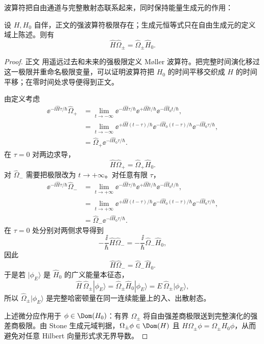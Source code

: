 波算符把自由通道与完整散射态联系起来，同时保持能量生成元的作用：


\begin{proposition}[波算符的时间演化交织]
设 $H,H_0$ 自伴，正文的强波算符极限存在；生成元恒等式只在自由生成元的定义域上陈述。则有
\begin{equation}
 {\hat H\hat\Omega_\pm=\hat\Omega_\pm\hat H_0.}
\label{eq:moller-intertwining-r68}
\end{equation}
\end{proposition}
\begin{proof}
正文 用遥远过去和未来的强极限定义 Møller 波算符。把完整时间演化移过这一极限并重命名极限变量，可以证明波算符把 $H_0$ 的时间平移交织成 $H$ 的时间平移；在零时间处求导便得到正文。



由定义考虑
\begin{align*}
 \ee^{-\ii\hat H\tau/\hbar}\hat\Omega_+
 &=
 \lim_{t\to-\infty}
 \ee^{-\ii\hat H\tau/\hbar}
 \ee^{+\ii\hat Ht/\hbar}
 \ee^{-\ii\hat H_0t/\hbar},\\
 &=
 \lim_{t\to-\infty}
 \ee^{+\ii\hat H(t-\tau)/\hbar}
 \ee^{-\ii\hat H_0(t-\tau)/\hbar}
 \ee^{-\ii\hat H_0\tau/\hbar},\\
 &=\hat\Omega_+\ee^{-\ii\hat H_0\tau/\hbar}.
\end{align*}
在 $\tau=0$ 对两边求导，
\begin{equation*}
 {
 \hat H\hat\Omega_+
 =\hat\Omega_+\hat H_0.}
 \end{equation*}
对 $\hat\Omega_-$ 需要把极限改为 $t\to+\infty$。对任意有限 $\tau$，
\begin{align*}
 \ee^{-\ii\hat H\tau/\hbar}\hat\Omega_-
 &=\lim_{t\to+\infty}
 \ee^{-\ii\hat H\tau/\hbar}
 \ee^{+\ii\hat Ht/\hbar}
 \ee^{-\ii\hat H_0t/\hbar},\\
 &=\lim_{t\to+\infty}
 \ee^{+\ii\hat H(t-\tau)/\hbar}
 \ee^{-\ii\hat H_0(t-\tau)/\hbar}
 \ee^{-\ii\hat H_0\tau/\hbar},\\
 &=\hat\Omega_-\ee^{-\ii\hat H_0\tau/\hbar}.
\end{align*}
在 $\tau=0$ 处分别对两侧求导得到
\[
 -\frac{\ii}{\hbar}\hat H\hat\Omega_-
 =-\frac{\ii}{\hbar}\hat\Omega_-\hat H_0,
\]
因此
\[
 \hat H\hat\Omega_-=\hat\Omega_-\hat H_0.
\]
于是若 $|\phi_E\rangle$ 是 $\hat H_0$ 的广义能量本征态，
\[
 \hat H\,\hat\Omega_\pm|\phi_E\rangle
 =\hat\Omega_\pm\hat H_0|\phi_E\rangle
 =E\,\hat\Omega_\pm|\phi_E\rangle,
\]
所以 $\hat\Omega_\pm|\phi_E\rangle$ 是完整哈密顿量在同一连续能量上的入、出散射态。

上述微分应作用于 $\phi\in\Dom(H_0)$：有界 $\Omega_\pm$ 将自由强差商极限送到完整演化的强差商极限。由 Stone 生成元域判据，$\Omega_\pm\phi\in\Dom(H)$ 且 $H\Omega_\pm\phi=\Omega_\pm H_0\phi$，从而避免对任意 Hilbert 向量形式求无界导数。
\end{proof}

